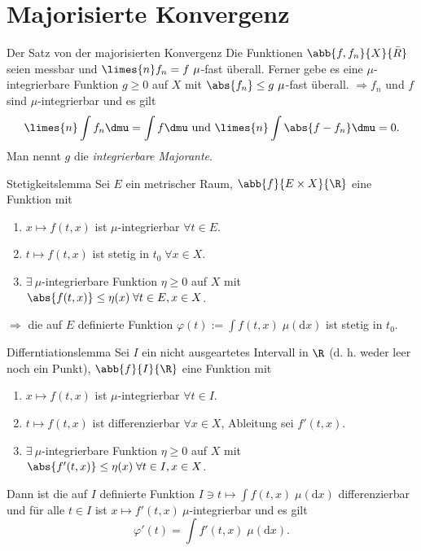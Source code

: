 \section*{Majorisierte Konvergenz}

\begin{karte}{Der Satz von der majorisierten Konvergenz}
	Die Funktionen \( \abb{f, f_n}{X}{\bar{R}} \) 
	seien messbar und \( \limes{n} f_n = f\ \mu \)-fast überall. 
	Ferner gebe es eine \(\mu\)-integrierbare Funktion 
	\( g \geq 0 \) auf \(X\) mit \( \abs{f_n} \leq g\ \mu \)-fast überall.
	\( \Rightarrow f_n \) und \(f\) sind \( \mu \)-integrierbar und es gilt 
	\[ \limes{n} \int f_n \dmu = \int f \dmu \text{ und } \limes{n} \int \abs{ f - f_n } \dmu = 0. \]
	Man nennt \(g\) die \textit{integrierbare Majorante}.
\end{karte}

\begin{karte}{Stetigkeitslemma}
	Sei \( E \) ein metrischer Raum, \( \abb{f}{E\times X}{\R} \) eine Funktion mit 
	\begin{enumerate}
		\item \( x\mapsto f(t,x) \) ist \(\mu\)-integrierbar \(\forall t\in E\).
		\item \( t\mapsto f(t,x) \) ist stetig in \(t_0 \;\forall x\in X\).
		\item \( \exists \ \mu \)-integrierbare Funktion 
		\( \eta \geq 0 \) auf \( X \) mit \( \abs{f(t,x)} \leq \eta(x) \;\forall t\in E, x\in X \).
	\end{enumerate}
	\( \Rightarrow \) die auf \(E\) definierte Funktion 
	\( \varphi(t) := \int f(t,x) \;\mu(\text{d}x) \) ist stetig in \( t_0 \).
\end{karte}

\begin{karte}{Differntiationslemma}
	Sei \(I\) ein nicht ausgeartetes Intervall in \(\R\) (d. h. weder leer noch ein Punkt), 
	\( \abb{f}{I}{\R} \) eine Funktion mit 
	\begin{enumerate}
		\item \( x\mapsto f(t,x) \) ist \(\mu\)-integrierbar \(\forall t\in I\).
		\item \( t\mapsto f(t,x) \) ist differenzierbar \(\forall x\in X\), 
		Ableitung sei \(f'(t,x)\).
		\item \( \exists \ \mu \)-integrierbare Funktion 
		\( \eta \geq 0 \) auf \( X \) mit \( \abs{f'(t,x)} \leq \eta(x) \;\forall t\in I, x\in X \).
	\end{enumerate}
	Dann ist die auf \(I\) definierte Funktion 
	\( I \ni t \mapsto \int f(t,x) \;\mu(\text{d}x) \) 
	differenzierbar und für alle \( t\in I \) 
	ist \( x \mapsto f'(t,x)\ \mu \)-integrierbar und
	es gilt 
	\[ \varphi'(t) = \int f'(t,x) \;\mu(\text{d}{x}). \]
\end{karte}